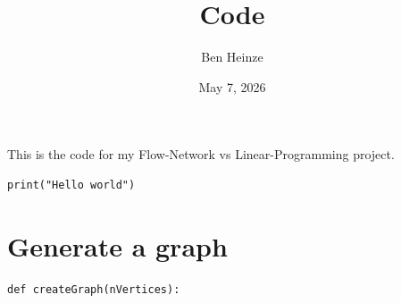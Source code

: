 \documentclass[11pt]{article}
\author{Ben Heinze}
\date{May 7, 2026}
\title{Code}
\begin{document}
\maketitle
This is the code for my Flow-Network vs Linear-Programming project.

\begin{verbatim}
print("Hello world") 
\end{verbatim}



\section{Generate a graph}
\label{sec:org02ac8fd}

\begin{verbatim}
def createGraph(nVertices): 
\end{verbatim}
\end{document}
